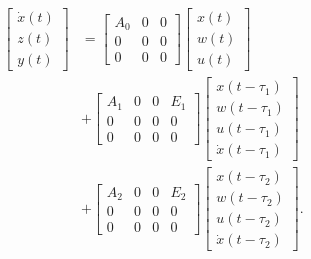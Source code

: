 \documentclass[twocolumn]{autart}    %
\begin{document}
\begin{equation}
    \begin{aligned}
        \begin{bmatrix}
            \dot{x}(t) \\
            z(t) \\
            y(t) 
        \end{bmatrix} & = \begin{bmatrix}
            A_{0} & 0 & 0\\
            0 & 0 & 0\\
            0 & 0 & 0
        \end{bmatrix}\begin{bmatrix}
            x(t) \\
            w(t) \\
            u(t) 
        \end{bmatrix} \\ 
        &+ \begin{bmatrix}
            A_{1} & 0 &0 & E_{1}\\
            0 & 0 & 0 & 0\\
            0 & 0 & 0 & 0
        \end{bmatrix} \begin{bmatrix}
            x(t-\tau_{1}) \\
            w(t-\tau_{1}) \\
            u(t-\tau_{1}) \\
            \dot{x}(t-\tau_{1})
        \end{bmatrix}\\
        &+ \begin{bmatrix}
            A_{2} & 0 &0 & E_{2}\\
            0 & 0 & 0 & 0\\
            0 & 0 & 0 & 0
        \end{bmatrix} \begin{bmatrix}
            x(t-\tau_{2}) \\
            w(t-\tau_{2}) \\
            u(t-\tau_{2}) \\
            \dot{x}(t-\tau_{2})
        \end{bmatrix}.\label{eq}
    \end{aligned}
\end{equation}
\end{document}
